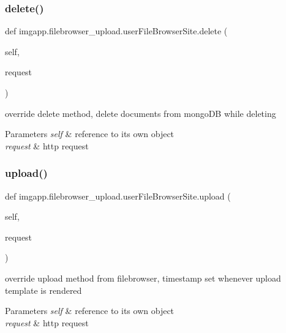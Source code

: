 \subsubsection{\texorpdfstring{delete()}{delete()}}
{\footnotesize\ttfamily def imgapp.\+filebrowser\+\_\+upload.\+user\+File\+Browser\+Site.\+delete (\begin{DoxyParamCaption}\item[{}]{self,  }\item[{}]{request }\end{DoxyParamCaption})}



override delete method, delete documents from mongo\+DB while deleting 


\begin{DoxyParams}{Parameters}
{\em self} & reference to it\textquotesingle{}s own object \\
\hline
{\em request} & http request \\
\hline
\end{DoxyParams}
\mbox{\label{classimgapp_1_1filebrowser__upload_1_1userFileBrowserSite_ae8621cf07e7a542bde67af9ab97790f6}} 
\subsubsection{\texorpdfstring{upload()}{upload()}}
{\footnotesize\ttfamily def imgapp.\+filebrowser\+\_\+upload.\+user\+File\+Browser\+Site.\+upload (\begin{DoxyParamCaption}\item[{}]{self,  }\item[{}]{request }\end{DoxyParamCaption})}



override upload method from filebrowser, timestamp set whenever upload template is rendered 


\begin{DoxyParams}{Parameters}
{\em self} & reference to it\textquotesingle{}s own object \\
\hline
{\em request} & http request \\
\hline
\end{DoxyParams}


